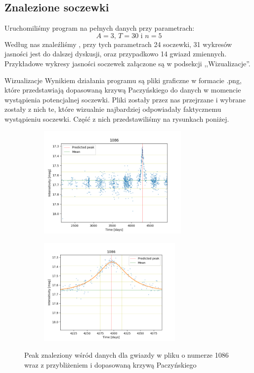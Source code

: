 \documentclass[a4paper,11pt]{article}
\newcommand{\ak}{\hspace{0.7 cm}}
\begin{document}
\subsection{Znalezione soczewki}
\ak Uruchomiliśmy program na pełnych danych przy parametrach: 
$$A=3\textrm{, } T=30 \textrm{ i } n=5$$
\ak Według nas znaleźliśmy , przy tych parametrach 24 soczewki, 31 wykresów jasności jest do dalszej dyskusji, oraz przypadkowo 14 gwiazd zmiennych. Przykładowe wykresy jasności soczewek załączone są w podsekcji ,,Wizualizacje''. 
\begin{subsection}{Wizualizacje}
\ak Wynikiem działania programu są pliki graficzne w formacie .png, które przedstawiają dopasowaną krzywą Paczyńskiego do danych w momencie wystąpienia potencjalnej soczewki. Pliki zostały przez nas przejrzane i wybrane zostały z nich te, które wizualnie najbardziej odpowiadały faktycznemu wystąpieniu soczewki. Część z nich przedstawiliśmy na rysunkach poniżej.
\begin{figure}[H]
\begin{subfigure}{0.5\textwidth}
\centering
\includegraphics[width=\linewidth,height=5.5cm]{1086.png}
\label{Fig_4}
\end{subfigure}
\begin{subfigure}{0.5\textwidth}
\centering
\includegraphics[width=\linewidth,height=5.25cm]{1086_v.png}
\label{Fig_5}
\end{subfigure}
\caption{Peak znaleziony wśród danych dla gwiazdy w pliku o numerze 1086 wraz z przybliżeniem i dopasowaną krzywą Paczyńskiego}

\end{figure}
\end{subsection}
\end{document}
